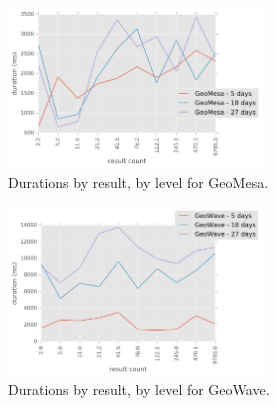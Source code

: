 \begin{figure}[h!tb]
  \centering
  \includegraphics[width=0.60\textwidth]{../docs/img/tracks/geomesa-duration-by-result-count-and-days.png}
  \caption{Durations by result, by level for GeoMesa.}
  \label{tracksgm2}
\end{figure}

\begin{figure}[h!tb]
  \centering
  \includegraphics[width=0.60\textwidth]{../docs/img/tracks/geowave-duration-by-result-count-and-days.png}
  \caption{Durations by result, by level for GeoWave.}
  \label{tracksgw2}
\end{figure}
